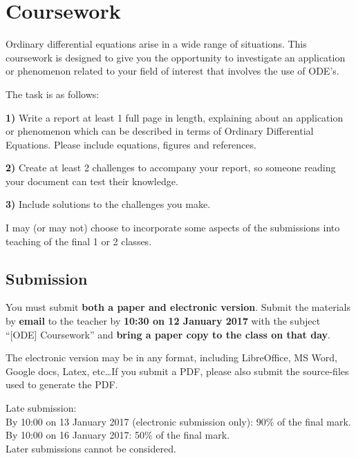 \newpage
\section{Coursework}
Ordinary differential equations arise in a wide range of situations. This coursework is designed to give you the opportunity to investigate an application or phenomenon related to your field of interest that involves the use of ODE's.

The task is as follows:

\textbf{1)} Write a report at least 1 full page in length, explaining about an application or phenomenon which can be described in terms of Ordinary Differential Equations. Please include equations, figures and references.

\textbf{2)} Create at least 2 challenges to accompany your report, so someone reading your document can test their knowledge.

\textbf{3)} Include solutions to the challenges you make.

I may (or may not) choose to incorporate some aspects of the submissions into teaching of the final 1 or 2 classes.

\subsection{Submission}
You must submit \textbf{both a paper and electronic version}. Submit the materials by \textbf{email} to the teacher by \textbf{10:30 on 12 January 2017} with the subject ``[ODE] Coursework'' and \textbf{bring a paper copy to the class on that day}.

The electronic version may be in any format, including LibreOffice, MS Word, Google docs, Latex, etc\ldots If you submit a PDF, please also submit the source-files used to generate the PDF.

Late submission:\\
By 10:00 on 13 January 2017 (electronic submission only): 90\% of the final mark.\\
By 10:00 on 16 January 2017: 50\% of the final mark.\\
Later submissions cannot be considered.

